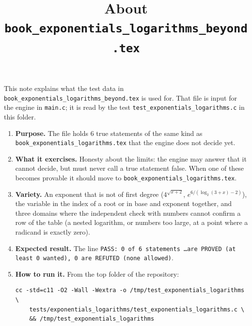 \documentclass[11pt,a4paper]{article}
\title{About \texttt{book\_exponentials\_logarithms\_beyond.tex}}
\author{}
\date{}
\begin{document}
\maketitle
This note explains what the test data in \texttt{book\_exponentials\_logarithms\_beyond.tex} is used for. That file is input for the engine in \texttt{main.c}; it is read by the test \texttt{test\_exponentials\_logarithms.c} in this folder.

\begin{enumerate}
\item \textbf{Purpose.} The file holds 6 true statements of the same kind as \texttt{book\_exponentials\_logarithms.tex} that the engine does not decide yet.

\item \textbf{What it exercises.} Honesty about the limits: the engine may answer that it cannot decide, but must never call a true statement false. When one of these becomes provable it should move to \texttt{book\_exponentials\_logarithms.tex}.

\item \textbf{Variety.} An exponent that is not of first degree ($4^{\sqrt{x+2}}$, $e^{6/(\log_2(3+x) - 2)}$), the variable in the index of a root or in base and exponent together, and three domains where the independent check with numbers cannot confirm a row of the table (a nested logarithm, or numbers too large, at a point where a radicand is exactly zero).

\item \textbf{Expected result.} The line \texttt{PASS: 0 of 6 statements \ldots are PROVED (at least 0 wanted), 0 are REFUTED (none allowed)}.

\item \textbf{How to run it.} From the top folder of the repository:
\begin{verbatim}
cc -std=c11 -O2 -Wall -Wextra -o /tmp/test_exponentials_logarithms \
    tests/exponentials_logarithms/test_exponentials_logarithms.c \
    && /tmp/test_exponentials_logarithms
\end{verbatim}
\end{enumerate}
\end{document}
